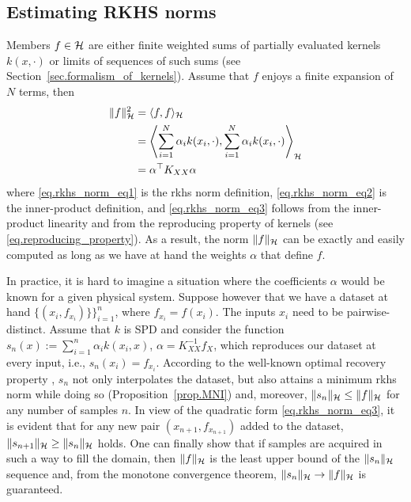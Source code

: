 \subsection{Estimating RKHS norms}
\label{sec.appendix_estimating_rkhs_norms}

Members $f \in \mathcal{H}$ are either finite weighted sums of partially evaluated kernels $k(x,\cdot)$ or limits of sequences of such sums (see Section~\ref{sec.formalism_of_kernels}). Assume that $f$ enjoys a finite expansion of $N$ terms, then
\begin{align}
	\Vert f \Vert_{\mathcal{H}}^2 &= \langle f, f \rangle_{\mathcal{H}} \label{eq.rkhs_norm_eq1} \\
	&= \left\langle \sum_{i=1}^N \alpha_i k(x_i,\cdot), \sum_{i=1}^N \alpha_i k(x_i,\cdot) \right\rangle_{\mathcal{H}} \label{eq.rkhs_norm_eq2} \\
	&= \alpha^\top K_{XX} \alpha \label{eq.rkhs_norm_eq3}
\end{align}
where \eqref{eq.rkhs_norm_eq1} is the \ac{rkhs} norm definition, \eqref{eq.rkhs_norm_eq2} is the inner-product definition, and \eqref{eq.rkhs_norm_eq3} follows from the inner-product linearity and from the reproducing property of kernels (see \eqref{eq.reproducing_property}). As a result, the norm $\Vert f \Vert_{\mathcal{H}}$ can be exactly and easily computed as long as we have at hand the weights $\alpha$ that define $f$.

In practice, it is hard to imagine a situation where the coefficients $\alpha$ would be known for a given physical system. Suppose however that we have a dataset at hand $\{(x_i,f_{x_i})\}\}_{i=1}^n$, where $f_{x_i} = f(x_i)$. The inputs $x_i$ need to be pairwise-distinct. Assume that $k$ is SPD and consider the function $s_n(x) := \sum_{i=1}^n \alpha_i k(x_i,x)$, $\alpha = K_{XX}^{-1} f_X$, which reproduces our dataset at every input, i.e., $s_n(x_i) = f_{x_i}$. According to the well-known optimal recovery property \cite[§8.3]{iske2018approximation}, $s_n$ not only interpolates the dataset, but also attains a minimum \ac{rkhs} norm while doing so  (Proposition~\ref{prop.MNI}) and, moreover, $\Vert s_n \Vert_{\mathcal{H}} \leq \Vert f \Vert_{\mathcal{H}}$ for any number of samples $n$. In view of the quadratic form \eqref{eq.rkhs_norm_eq3}, it is evident that for any new pair $(x_{n+1},f_{x_{n+1}})$ added to the dataset, $\Vert s_{n+1} \Vert_{\mathcal{H}} \geq \Vert s_n \Vert_{\mathcal{H}}$ holds. One can finally show that if samples are acquired in such a way to fill the domain, then $\Vert f \Vert_{\mathcal{H}}$ is the least upper bound of the $\Vert s_n \Vert_{\mathcal{H}}$ sequence and, from the monotone convergence theorem, $\Vert s_n \Vert_{\mathcal{H}} \rightarrow \Vert f \Vert_{\mathcal{H}}$ is guaranteed.

